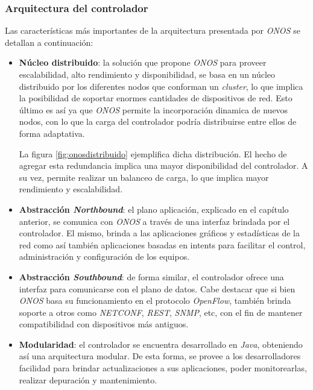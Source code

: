 \subsubsection{Arquitectura del controlador}
Las características más importantes de la arquitectura presentada por \textit{ONOS} \parencite{onffwhite} se detallan a continuación:

\begin{itemize}
	\item \textbf{Núcleo distribuido}: la solución que propone \textit{ONOS} para proveer escalabilidad, alto rendimiento y disponibilidad, se basa en un núcleo distribuido por los diferentes nodos que conforman un \textit{cluster}, lo que implica la posibilidad de soportar enormes cantidades de dispositivos de red. Esto último es así ya que \textit{ONOS} permite la incorporación dinamica de nuevos nodos, con lo que la carga del controlador podría distribuirse entre ellos de forma adaptativa.
	
	La figura \ref{fig:onosdistribuido} ejemplifica dicha distribución. El hecho de agregar esta redundancia implica una mayor disponibilidad del controlador. A su vez, permite realizar un balanceo de carga, lo que implica mayor rendimiento y escalabilidad.


	\item \textbf{Abstracción \textit{Northbound}}: el plano aplicación, explicado en el capítulo anterior, se comunica con \textit{ONOS} a través de una interfaz brindada por el controlador. El mismo, brinda a las aplicaciones gráficos y estadísticas de la red como así también aplicaciones basadas en intents para facilitar el control, administración y configuración de los equipos.
	\item \textbf{Abstracción \textit{Southbound}}: de forma similar, el controlador ofrece una interfaz para comunicarse con el plano de datos. Cabe destacar que si bien \textit{ONOS} basa su funcionamiento en el protocolo \textit{OpenFlow}, también brinda soporte a otros como \textit{NETCONF}, \textit{REST}, \textit{SNMP}, etc, con el fin de mantener compatibilidad con dispositivos más antiguos.
	\item \textbf{Modularidad}: el controlador se encuentra desarrollado en \textit{Java}, obteniendo así una arquitectura modular. De esta forma, se provee a los desarrolladores facilidad para brindar actualizaciones a sus aplicaciones, poder monitorearlas, realizar depuración y mantenimiento.  
\end{itemize}

